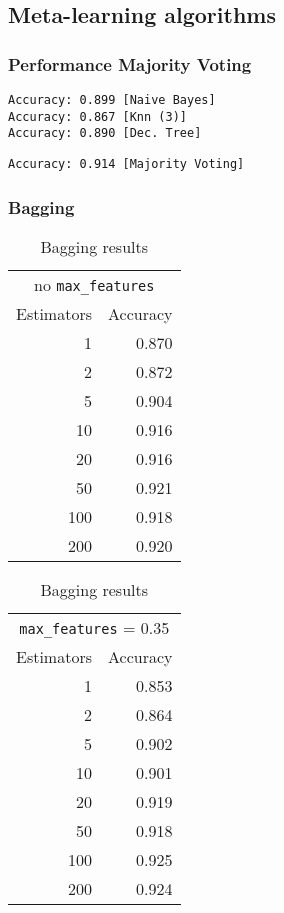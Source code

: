 
\subsection{Meta-learning algorithms}%
\label{sub:meta}

\pagebreak
\subsubsection{Performance Majority Voting}

\begin{verbatim}
Accuracy: 0.899 [Naive Bayes]
Accuracy: 0.867 [Knn (3)]
Accuracy: 0.890 [Dec. Tree]
\end{verbatim}

\begin{verbatim}
Accuracy: 0.914 [Majority Voting]
\end{verbatim}
 
\pagebreak
\subsubsection{Bagging}

\begin{table}[H]
\centering
\caption{Bagging results}%
\label{tab:bagging}
\begin{tabular}{rr}
\toprule
\multicolumn{2}{c}{no \texttt{max\_features}}\\
Estimators & Accuracy \\
\midrule
1   & 0.870 \\
2   & 0.872 \\
5   & 0.904 \\
10  & 0.916 \\
20  & 0.916 \\
50  & 0.921 \\
100 & 0.918 \\
200 & 0.920 \\
\bottomrule
\end{tabular}
\quad
\begin{tabular}{rr}
\toprule
\multicolumn{2}{c}{\texttt{max\_features} = 0.35}\\
Estimators & Accuracy \\
\midrule
1  & 0.853 \\
2  & 0.864 \\
5  & 0.902 \\
10 & 0.901  \\
20 & 0.919  \\
50 & 0.918  \\
100 & 0.925   \\
200 & 0.924 \\
\bottomrule
\end{tabular}
\end{table}

